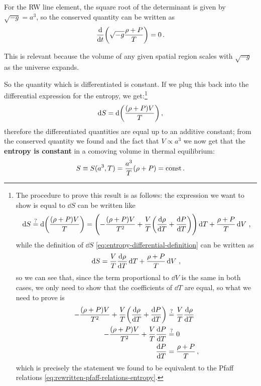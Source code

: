 \documentclass[main.tex]{subfiles}
\begin{document}
For the RW line element, the square root of the determinant is given by \(\sqrt{-g} =  a^3 \), so the conserved quantity can be written as
%
\begin{equation}
  \dv{}{t} \qty(\sqrt{-g }  \frac{\rho + P}{T}) = 0
\,.
\end{equation}

This is relevant because the volume of any given spatial region scales with \(\sqrt{-g}\) as the universe expands. 

So the quantity which is differentiated is constant. If we plug this back into the differential expression for the entropy, we get:\footnote{The procedure to prove this result is as follows: the expression we want to show is equal to \(\dd{S}\) can be written like 
%
\begin{align}
\dd{S} \overset{?}{=} \dd{\qty(\frac{(\rho + P)V}{T})} = \qty(- \frac{(\rho + P) V}{T^2} + \frac{V}{T} \qty(\dv{\rho }{T} + \dv{P}{T})) \dd{T} + \frac{\rho + P}{T} \dd{V} 
\,,
\end{align}
%
while the definition of \(\dd{S}\) \eqref{eq:entropy-differential-definition} can be written as 
%
\begin{align}
\dd{S} = \frac{V}{T} \dv{\rho }{T} \dd{T} + \frac{\rho + P}{T} \dd{V}
\,,
\end{align}
%
so we can see that, since the term proportional to \(\dd{V}\) is the same in both cases, we only need to show that the coefficients of \(\dd{T}\) are equal, so what we need to prove is 
%
\begin{align}
- \frac{(\rho + P) V}{T^2} + \frac{V}{T} \qty(\dv{\rho }{T} + \dv{P}{T})
&\overset{?}{=} \frac{V}{T} \dv{\rho }{T}  \\
- \frac{(\rho + P) V}{T^2} + \frac{V}{T} \dv{P}{T} &\overset{?}{=} 0  \\
\dv{P}{T} &= \frac{\rho + P}{T}
\,,
\end{align}
%
which is precisely the statement we found to be equivalent to the Pfaff relations \eqref{eq:rewritten-pfaff-relations-entropy}. 
}
%
\begin{equation}
  \dd{S} = \dd \qty(\frac{(\rho + P) V}{T})
\,,
\end{equation}
%
therefore the differentiated quantities are equal up to an additive constant; from the conserved quantity we found and the fact that \(V \propto a^3\) we now get that the \textbf{entropy is constant} in a comoving volume in thermal equilibrium:
%
\begin{equation}
  S \equiv S(a^3, T) 
  = \frac{a^3}{T} \qty(\rho + P)
  = \text{const}
\,.
\end{equation}
\end{document}
